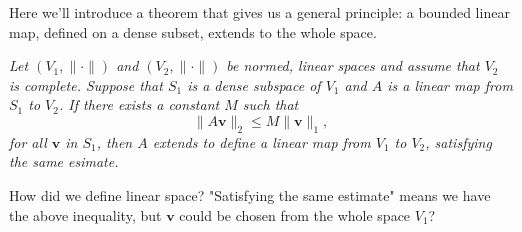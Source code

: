 Here we'll introduce a theorem that gives us a general principle: a bounded linear map, defined on a dense subset, extends to the whole space. 

\begin{Theorem}[Theorem 4.2.4.]
    \textit{Let $(V_1,\lVert\cdot\rVert)$ and $(V_2,\lVert\cdot\rVert)$ be normed, linear spaces and assume that $V_2$ is complete. Suppose that $S_1$ is a dense subspace of $V_1$ and $A$ is a linear map from $S_1$ to $V_2$. If there exists a constant $M$ such that \[\lVert A\mathbf v\rVert_2\leq M\lVert \mathbf v\rVert_1,\] for all $\mathbf v$ in $S_1$, then $A$ extends to define a linear map from $V_1$ to $V_2$, satisfying the same esimate.}
\end{Theorem}

\begin{Question}
    How did we define linear space? "Satisfying the same estimate" means we have the above inequality, but $\mathbf v$ could be chosen from the whole space $V_1$?
\end{Question}